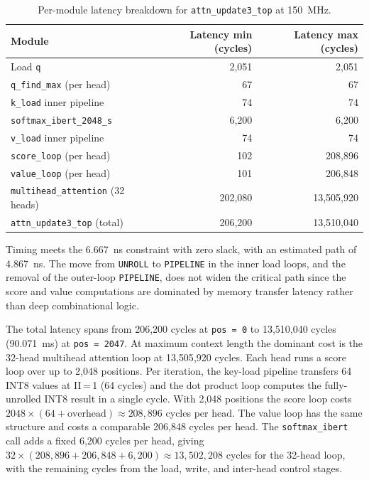 \begin{table}[H]
  \centering
  \begin{tabular}{lrr}
    \toprule
    Module & Latency min (cycles) & Latency max (cycles) \\
    \midrule
    Load \texttt{q}                          & 2{,}051   & 2{,}051 \\
    \texttt{q\_find\_max} (per head)         &      67   &      67 \\
    \texttt{k\_load} inner pipeline          &      74   &      74 \\
    \texttt{softmax\_ibert\_2048\_s}         &   6{,}200 &  6{,}200 \\
    \texttt{v\_load} inner pipeline          &      74   &      74 \\
    \texttt{score\_loop} (per head)          &     102   & 208{,}896 \\
    \texttt{value\_loop} (per head)          &     101   & 206{,}848 \\
    \texttt{multihead\_attention} (32 heads) & 202{,}080 & 13{,}505{,}920 \\
    \texttt{attn\_update3\_top} (total)      & 206{,}200 & 13{,}510{,}040 \\
    \bottomrule
  \end{tabular}
  \caption{Per-module latency breakdown for \texttt{attn\_update3\_top}
           at \SI{150}{\mega\hertz}.}
  \label{tab:attn_u3_latency}
\end{table}

Timing meets the \SI{6.667}{\nano\second} constraint with zero slack,
with an estimated path of \SI{4.867}{\nano\second}. The move from
\texttt{UNROLL} to \texttt{PIPELINE} in the inner load loops, and the
removal of the outer-loop \texttt{PIPELINE}, does not widen the critical
path since the score and value computations are dominated by memory
transfer latency rather than deep combinational logic.

The total latency spans from 206{,}200 cycles at \texttt{pos\,=\,0} to
13{,}510{,}040 cycles (\SI{90.071}{\milli\second}) at \texttt{pos\,=\,2047}.
At maximum context length the dominant cost is the 32-head multihead
attention loop at 13{,}505{,}920 cycles. Each head runs a score loop over
up to 2{,}048 positions. Per iteration, the key-load pipeline transfers
64 INT8 values at II\,=\,1 (64 cycles) and the dot product loop computes
the fully-unrolled INT8 result in a single cycle. With 2{,}048 positions
the score loop costs $2048 \times (64 + \text{overhead}) \approx
208{,}896$ cycles per head. The value loop has the same structure and
costs a comparable 206{,}848 cycles per head. The
\texttt{softmax\_ibert} call adds a fixed 6{,}200 cycles per head,
giving $32 \times (208{,}896 + 206{,}848 + 6{,}200) \approx
13{,}502{,}208$ cycles for the 32-head loop, with the remaining cycles
from the load, write, and inter-head control stages.

